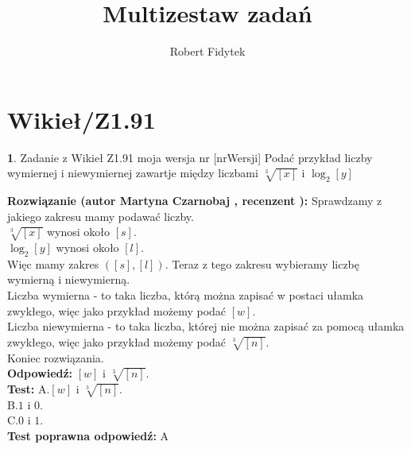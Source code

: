 \documentclass[12pt, a4paper]{article}
\title{Multizestaw zadań}
\author{Robert Fidytek}
\date{}
\theoremstyle{definition} %
\newtheorem{zad}{}
\newcommand{\kategoria}[1]{\section{#1}} %
\newcommand{\zadStart}[1]{\begin{zad}#1\newline} %
\newcommand{\zadStop}{\end{zad}}   %
\newcommand{\rozwStart}[2]{\noindent \textbf{Rozwiązanie (autor #1 , recenzent #2): }\newline} %
\newcommand{\rozwStop}{\newline}                                            %
\newcommand{\odpStart}{\noindent \textbf{Odpowiedź:}\newline}    %
\newcommand{\odpStop}{\newline}                                             %
\newcommand{\testStart}{\noindent \textbf{Test:}\newline} %
\newcommand{\testStop}{\newline} %
\newcommand{\kluczStart}{\noindent \textbf{Test poprawna odpowiedź:}\newline} %
\newcommand{\kluczStop}{\newline} %
\begin{document}
\maketitle


\kategoria{Wikieł/Z1.91}
\zadStart{Zadanie z Wikieł Z1.91 moja wersja nr [nrWersji]}
Podać przykład liczby wymiernej i niewymiernej zawartje między liczbami $\sqrt[3]{[x]}$ i $ \log_{2} [y] $
\zadStop
\rozwStart{Martyna Czarnobaj}{}
Sprawdzamy z jakiego zakresu mamy podawać liczby.\\
$\sqrt[3]{[x]} $ wynosi około $ [s] $.\\
$ \log_{2} [y] $ wynosi około $ [l] $.\\
Więc mamy zakres $ ([s],[l]) $. Teraz z tego zakresu wybieramy liczbę wymierną i niewymierną.\\
Liczba wymierna - to taka liczba, którą można zapisać w postaci ułamka zwykłego, więc jako przykład możemy podać $ [w] $.\\
Liczba niewymierna - to taka liczba, której nie można zapisać za pomocą ułamka zwykłego, więc jako przykład możemy podać $ \sqrt[3]{[n]} $.\\
Koniec rozwiązania.\\
\rozwStop
\odpStart
 $ [w] $ i $ \sqrt[3]{[n]} $.\\
\odpStop
\testStart
A.$ [w] $ i $ \sqrt[3]{[n]} $.\\
B.$ 1 $ i $ 0 $.\\
C.$ 0 $ i $ 1 $.\\
\testStop
\kluczStart
A
\kluczStop
\end{document}
